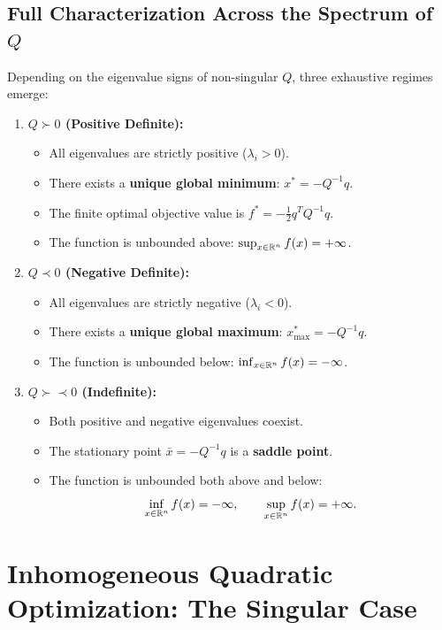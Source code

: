 \subsection{Full Characterization Across the Spectrum of \texorpdfstring{$Q$}{Q}}
Depending on the eigenvalue signs of non-singular $Q$, three exhaustive regimes emerge:
\begin{enumerate}
    \item \textbf{$Q \succ 0$ (Positive Definite):}
    \begin{itemize}
        \item All eigenvalues are strictly positive ($\lambda_i > 0$).
        \item There exists a \textbf{unique global minimum}: $x^* = -Q^{-1} q$.
        \item The finite optimal objective value is $f^* = -\frac{1}{2} q^T Q^{-1} q$.
        \item The function is unbounded above: $\sup_{x \in \mathbb{R}^n} f(x) = +\infty$.
    \end{itemize}
    \item \textbf{$Q \prec 0$ (Negative Definite):}
    \begin{itemize}
        \item All eigenvalues are strictly negative ($\lambda_i < 0$).
        \item There exists a \textbf{unique global maximum}: $x_{\max}^* = -Q^{-1} q$.
        \item The function is unbounded below: $\inf_{x \in \mathbb{R}^n} f(x) = -\infty$.
    \end{itemize}
    \item \textbf{$Q \succ\prec 0$ (Indefinite):}
    \begin{itemize}
        \item Both positive and negative eigenvalues coexist.
        \item The stationary point $\bar{x} = -Q^{-1} q$ is a \textbf{saddle point}.
        \item The function is unbounded both above and below:
        \begin{equation}
            \inf_{x \in \mathbb{R}^n} f(x) = -\infty, \qquad \sup_{x \in \mathbb{R}^n} f(x) = +\infty.
        \end{equation}
    \end{itemize}
\end{enumerate}


\FloatBarrier
\section{Inhomogeneous Quadratic Optimization: The Singular Case}
\label{sec:inhomogeneous-quadratic-singular}

